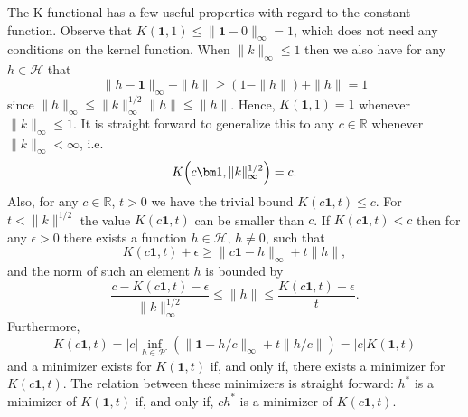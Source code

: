 \documentclass[AHL,Unicode,longabstracts,published]{cedram}
\theoremstyle{remark}
\newcommand{\R}{\mathbb{R}}
\newcommand{\cH}{\mathcal{H}}
\let\originalleft\left
\let\originalright\right
\renewcommand{\left}{\mathopen{}\mathclose\bgroup\originalleft}
\renewcommand{\right}{\aftergroup\egroup\originalright}
\begin{document}
The K-functional has a few useful properties with regard to the constant function. Observe that $K(\bm 1,1) \leq \|\bm 1 - 0\|_\infty = 1$, which does not need any conditions on the kernel function. When $\|k\|_\infty \leq 1$ then we also have for any $h\in \cH$ that
\[
\|h - \bm 1\|_\infty + \|h\| \geq (1- \|h\|) + \|h\| = 1
\]
since $\|h\|_\infty \leq \|k\|^{1/2}_\infty \|h\| \leq \|h\|$. Hence, $K(\bm 1,1) = 1$ whenever $\|k\|_\infty \leq 1$. It is straight forward to generalize this to any $c \in \R$ whenever $\|k\|_\infty < \infty$, i.e.
\begin{equation}
K\left(c\bm 1,\|k\|^{1/2}_\infty\right) = c.
\end{equation}
Also, for any $c \in \R$, $t>0$ we have the trivial bound $K(c\bm 1,t) \leq c$. For $t< \|k\|^{1/2}$ the value $K(c \bm 1,t)$ can be smaller than $c$. If $K(c \bm 1,t) < c$ then for any $\epsilon >0$ there exists a function $h\in \cH$, $h\not = 0$, such that
\[
K(c\bm 1,t) + \epsilon \geq \|c \bm 1 - h\|_\infty + t \|h\|,
\]
and the norm of such an element $h$ is bounded by
\[
\frac{c - K(c \bm 1,t) - \epsilon}{\|k\|_\infty^{1/2}} \leq \|h\| \leq \frac{K(c\bm 1,t) + \epsilon}{t}.
\]
Furthermore,
\begin{equation*}
K(c \bm 1, t) = |c| \inf_{h\in \cH} (\|\bm 1 - h/c\|_\infty + t \|h/c\|) = |c| K(\bm 1,t)
\end{equation*}
and a minimizer exists for $K(\bm 1,t)$ if, and only if, there exists a minimizer for $K(c \bm 1,t)$. The relation between these minimizers is straight forward: $h^*$ is a minimizer of $K(\bm 1,t)$ if, and only if, $c h^*$ is a minimizer of $K(c \bm 1,t)$.
\end{document}
